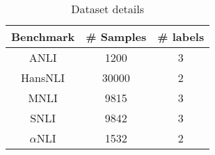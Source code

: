 
\begin{table}
  \centering
  \begin{tabular}{c|c|c}
    Benchmark & \# Samples & \# labels \\
    \hline
    ANLI & 1200 & 3 \\
    HansNLI & 30000 & 2 \\
    MNLI & 9815 & 3 \\
    SNLI & 9842 & 3 \\
    $\alpha$NLI & 1532 & 2 \\
  \end{tabular}
\caption{Dataset details}
\label{tab:dataset}
\end{table}
